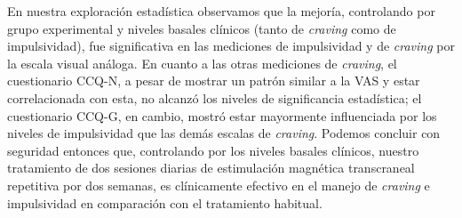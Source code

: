 En nuestra exploración estadística observamos que la mejoría, controlando por grupo experimental y niveles basales clínicos (tanto de \textit{craving} como de impulsividad), fue significativa en las mediciones de impulsividad y de \textit{craving} por la escala visual análoga. En cuanto a las otras mediciones de \textit{craving}, el cuestionario  CCQ-N, a pesar de mostrar un patrón similar a la VAS y estar correlacionada con esta, no alcanzó los niveles de significancia estadística; el cuestionario CCQ-G, en cambio, mostró estar mayormente influenciada por los niveles de impulsividad que las demás escalas de \textit{craving}.
Podemos concluir con seguridad entonces que, controlando por los niveles basales clínicos, nuestro tratamiento de dos sesiones diarias de estimulación magnética transcraneal repetitiva por dos semanas, es clínicamente efectivo en el manejo de \textit{craving} e impulsividad en comparación con el tratamiento habitual.

